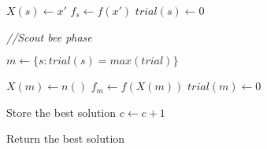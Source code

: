 \documentclass{article}
\begin{document}
\begin{algorithm}
\begin{algorithmic}[1]

				\State $X(s) \gets x'$
				\State $f_s \gets f(x')$
				\State $trial(s) \gets 0$
	
			\EndIf

		\EndIf

	\EndWhile

	\State \textit{//Scout bee phase}

	\State $m \gets \{s: trial(s) = max(trial)\}$


		\State $X(m) \gets n()$
		\State $f_m \gets f(X(m))$
		\State $trial(m) \gets 0$

	\EndIf

	\State Store the best solution
	\State $ c \gets c + 1$

\EndWhile

\State Return the best solution

\EndProcedure
\end{algorithmic}
\end{algorithm}

\clearpage
\end{document}
